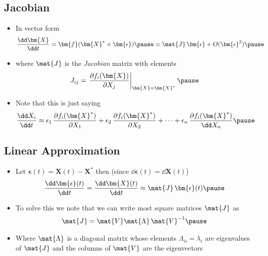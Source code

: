 \begin{slide}
\section[-2]{Jacobian}

\begin{PauseHighLight}
  \begin{itemize}
  \item In vector form
    \begin{align*}
      \frac{\dd \bm{X}}{\dd t} = \bm{f}(\bm{X}^*+\bm{\epsilon})\pause
      =  \mat{J}\, \bm{\epsilon} + O(\bm{\epsilon}^2)\pause
    \end{align*}
  \item where $\mat{J}$ is the \emph{Jacobian} matrix with elements
    \begin{align*}
      J_{ij} = \left. \frac{\partial f_i(\bm{X})}{\partial X_j}\right|_{\bm{X}=\bm{X}^*}\pause
    \end{align*}
  \item Note that this is just saying
    \begin{align*}
       \frac{\dd X_i}{\dd t} \approx  \epsilon_1\,\frac{\partial
      f_i(\bm{X}^*)}{\partial X_1} +  \epsilon_2\,\frac{\partial
      f_i(\bm{X}^*)}{\partial X_2} + \cdots +  \epsilon_n\,\frac{\partial
      f_i(\bm{X}^*)}{\dd X_n}\pause
    \end{align*}
  \end{itemize}
\end{PauseHighLight}

\end{slide}


\begin{slide}
\section{Linear Approximation}

\begin{PauseHighLight}
  \begin{itemize}
  \item Let $\bm{\epsilon}(t) = \bm{X}(t) - \bm{X}^*$ then (since $\dd
    \bm{\epsilon}(t) = \dd \bm{X}(t)$)
    \begin{align*}
      \frac{\dd \bm{\epsilon}(t)}{\dd t} = \frac{\dd \bm{X}(t)}{\dd t}
      \approx \mat{J}\, \bm{\epsilon}(t)\pause
    \end{align*}
  \item To solve this we note that we can write most square matrices
    $\mat{J}$ as
    \begin{align*}
      \mat{J} = \mat{V} \mat{\Lambda}\,\mat{V}^{-1}\pause
    \end{align*}
  \item Where $\mat{\Lambda}$ is a diagonal matrix whose elements
    $\Lambda_{ii}=\lambda_i$ are eigenvalues of $\mat{J}$ and the
    columns of $\mat{V}$ are the eigenvectors\pause
  \end{itemize}
\end{PauseHighLight}

\end{slide}

